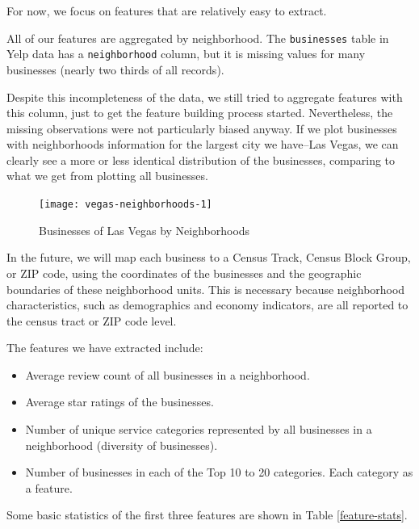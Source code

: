 \documentclass[draftclsnofoot]{IEEEtran}
\let\MYoriglatexcaption\caption
\renewcommand{\caption}[2][\relax]{\MYoriglatexcaption[#2]{#2}}
\begin{document}
For now, we focus on features that are relatively easy to extract.

All of our features are aggregated by neighborhood. The \texttt{businesses} table in Yelp data has a \texttt{neighborhood} column, but it is missing values for many businesses (nearly two thirds of all records).

Despite this incompleteness of the data, we still tried to aggregate features with this column, just to get the feature building process started. Nevertheless, the missing observations were not particularly biased anyway. If we plot businesses with neighborhoods information for the largest city we have--Las Vegas, we can clearly see a more or less identical distribution of the businesses, comparing to what we get from plotting all businesses.

\begin{figure}[h]
  \centering
    \texttt{[image: vegas-neighborhoods-1]}
  \caption{Businesses of Las Vegas by Neighborhoods}
  \label{vegas-neighborhoods}
\end{figure}

In the future, we will map each business to a Census Track, Census Block Group, or ZIP code, using the coordinates of the businesses and the geographic boundaries of these neighborhood units. This is necessary because neighborhood characteristics, such as demographics and economy indicators, are all reported to the census tract or ZIP code level.

The features we have extracted include:

\begin{itemize}
	\item Average review count of all businesses in a neighborhood.
	\item Average star ratings of the businesses.
	\item Number of unique service categories represented by all businesses in a neighborhood (diversity of businesses).
	\item Number of businesses in each of the Top 10 to 20 categories. Each category as a feature.
\end{itemize}

Some basic statistics of the first three features are shown in Table \ref{feature-stats}.
\end{document}
